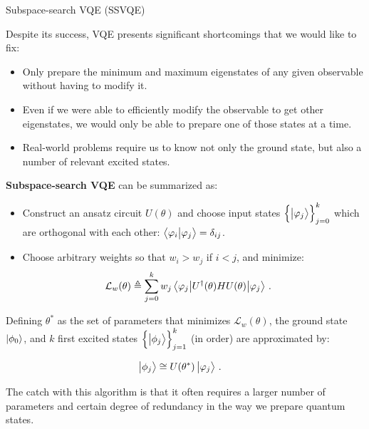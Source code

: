 \begin{frame}[allowframebreaks]{Subspace-search VQE (SSVQE)}

  Despite its success, VQE presents significant shortcomings that we would like to fix:

  \begin{itemize}
    \item<2-> Only prepare the minimum and maximum eigenstates of any given observable without having to modify it.
    \item<3-> Even if we were able to efficiently modify the observable to get other eigenstates, we would only be able to prepare one of those states at a time.
    \item<4-> Real-world problems require us to know not only the ground state, but also a number of relevant excited states.
  \end{itemize}

\break

  \textbf{Subspace-search VQE} can be summarized as:

  \begin{itemize}
    \item Construct an ansatz circuit $U(\theta)$ and choose input states $\qty{\ket{\varphi_j}}_{j=0}^{k}$ which are orthogonal with each other: $\braket{\varphi_i}{\varphi_j} =  \delta_{ij}$.
    \item Choose arbitrary weights so that $w_i > w_j$ if $i < j$, and minimize:
    \begin{gather*}
      \mathcal{L}_w(\theta) \triangleq \sum_{j = 0}^{k} w_j \mel{\varphi_j}{U^\dagger(\theta) H U(\theta)}{\varphi_j} \,.\quad
    \end{gather*}
  \end{itemize}

  Defining $\theta^*$ as the set of parameters that minimizes $\mathcal{L}_w(\theta)$, the ground state $\ket{\phi_{0}}$, and $k$ first excited states $\qty{\ket{\phi_{j}}}_{j=1}^k$ (in order) are approximated by:

  \begin{gather*}
    \ket{\phi_j} \cong U(\theta^*) \ket{\varphi_j} \,.\quad
  \end{gather*}

  The catch with this algorithm is that it often requires a larger number of parameters and certain degree of redundancy in the way we prepare quantum states.

\end{frame}
